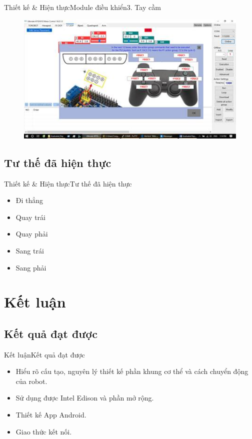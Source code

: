 \documentclass[compress, blue, 13pt,hyperref={pdfpagemode=FullScreen}]{beamer}
\begin{document}
\begin{frame}{Thiết kế \& Hiện thực}{Module điều khiển}{3. Tay cầm}
\begin{figure}[hbtp]
\centering
\includegraphics[scale=0.7]{images/image007.jpg}
\end{figure}
\end{frame}
%
\subsection{Tư thế đã hiện thực}
\begin{frame}{Thiết kế \& Hiện thực}{Tư thế đã hiện thực}
\begin{itemize}
\item Đi thẳng
\item Quay trái
\item Quay phải
\item Sang trái
\item Sang phải
\end{itemize}
\end{frame}
\section{Kết luận}
\subsection{Kết quả đạt được}
\begin{frame}{Kết luận}{Kết quả đạt được}
\begin{itemize}
\item Hiểu rõ cấu tạo, nguyên lý thiết kế phần khung cơ thể và cách chuyển động của robot.
\item Sử dụng được Intel Edison và phần mở rộng.
\item Thiết kế App Android.
\item Giao thức kết nối.
\end{itemize}
\end{frame}
\end{document}
